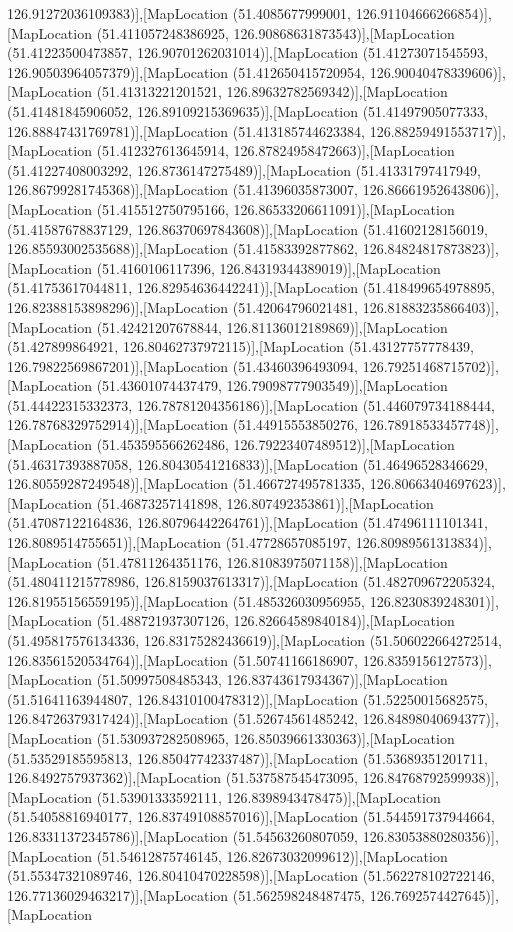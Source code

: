 126.91272036109383)],[MapLocation (51.4085677999001, 126.91104666266854)],[MapLocation (51.411057248386925, 126.90868631873543)],[MapLocation (51.41223500473857, 126.90701262031014)],[MapLocation (51.41273071545593, 126.90503964057379)],[MapLocation (51.412650415720954, 126.90040478339606)],[MapLocation (51.41313221201521, 126.89632782569342)],[MapLocation (51.41481845906052, 126.89109215369635)],[MapLocation (51.41497905077333, 126.88847431769781)],[MapLocation (51.413185744623384, 126.88259491553717)],[MapLocation (51.412327613645914, 126.87824958472663)],[MapLocation (51.41227408003292, 126.8736147275489)],[MapLocation (51.41331797417949, 126.86799281745368)],[MapLocation (51.41396035873007, 126.86661952643806)],[MapLocation (51.415512750795166, 126.86533206611091)],[MapLocation (51.41587678837129, 126.86370697843608)],[MapLocation (51.41602128156019, 126.85593002535688)],[MapLocation (51.41583392877862, 126.84824817873823)],[MapLocation (51.4160106117396, 126.84319344389019)],[MapLocation (51.41753617044811, 126.82954636442241)],[MapLocation (51.418499654978895, 126.82388153898296)],[MapLocation (51.42064796021481, 126.81883235866403)],[MapLocation (51.42421207678844, 126.81136012189869)],[MapLocation (51.427899864921, 126.80462737972115)],[MapLocation (51.43127757778439, 126.79822569867201)],[MapLocation (51.43460396493094, 126.79251468715702)],[MapLocation (51.43601074437479, 126.79098777903549)],[MapLocation (51.44422315332373, 126.78781204356186)],[MapLocation (51.446079734188444, 126.78768329752914)],[MapLocation (51.44915553850276, 126.78918533457748)],[MapLocation (51.453595566262486, 126.79223407489512)],[MapLocation (51.46317393887058, 126.80430541216833)],[MapLocation (51.46496528346629, 126.80559287249548)],[MapLocation (51.466727495781335, 126.80663404697623)],[MapLocation (51.46873257141898, 126.807492353861)],[MapLocation (51.47087122164836, 126.80796442264761)],[MapLocation (51.47496111101341, 126.8089514755651)],[MapLocation (51.47728657085197, 126.80989561313834)],[MapLocation (51.47811264351176, 126.81083975071158)],[MapLocation (51.480411215778986, 126.8159037613317)],[MapLocation (51.482709672205324, 126.81955156559195)],[MapLocation (51.485326030956955, 126.8230839248301)],[MapLocation (51.488721937307126, 126.82664589840184)],[MapLocation (51.495817576134336, 126.83175282436619)],[MapLocation (51.506022664272514, 126.83561520534764)],[MapLocation (51.50741166186907, 126.8359156127573)],[MapLocation (51.50997508485343, 126.83743617934367)],[MapLocation (51.51641163944807, 126.84310100478312)],[MapLocation (51.52250015682575, 126.84726379317424)],[MapLocation (51.52674561485242, 126.84898040694377)],[MapLocation (51.530937282508965, 126.85039661330363)],[MapLocation (51.53529185595813, 126.85047742337487)],[MapLocation (51.53689351201711, 126.8492757937362)],[MapLocation (51.537587545473095, 126.84768792599938)],[MapLocation (51.53901333592111, 126.8398943478475)],[MapLocation (51.54058816940177, 126.83749108857016)],[MapLocation (51.544591737944664, 126.83311372345786)],[MapLocation (51.54563260807059, 126.83053880280356)],[MapLocation (51.54612875746145, 126.82673032099612)],[MapLocation (51.55347321089746, 126.80410470228598)],[MapLocation (51.562278102722146, 126.77136029463217)],[MapLocation (51.562598248487475, 126.7692574427645)],[MapLocation 
